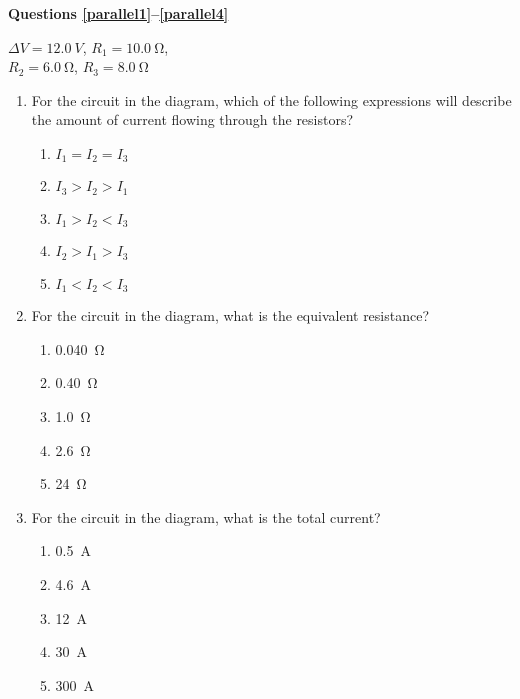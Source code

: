 \documentclass{../../../oss-apphys}
\begin{document}
\begin{multicols*}{2}
  \textbf{Questions \ref{parallel1}--\ref{parallel4}}
  \begin{center}
    
    \vspace{.1in}$\Delta V=\SI{12.0}{V}$, $R_1=\SI{10.0}{\ohm}$,\\
    $R_2=\SI{6.0}{\ohm}$, $R_3=\SI{8.0}{\ohm}$
  \end{center}

  \begin{enumerate}[leftmargin=18pt,resume]
  \item For the circuit in the diagram, which of the following expressions will
    describe the amount of current flowing through the resistors?
    \begin{enumerate}[noitemsep,topsep=0pt,leftmargin=18pt,label=(\Alph*)]
    \item $I_1=I_2=I_3$
    \item $I_3>I_2>I_1$
    \item $I_1>I_2<I_3$
    \item $I_2>I_1>I_3$
    \item $I_1<I_2<I_3$
    \end{enumerate}
    \label{parallel1}
    
  \item For the circuit in the diagram, what is the equivalent resistance?
    \begin{enumerate}[noitemsep,topsep=0pt,leftmargin=18pt,label=(\Alph*)]
      \item\SI{0.040}{\ohm}
      \item\SI{0.40}{\ohm}
      \item\SI{1.0}{\ohm}
      \item\SI{2.6}{\ohm}
      \item\SI{24}{\ohm}
    \end{enumerate}
    
  \item For the circuit in the diagram, what is the total current?
    \begin{enumerate}[noitemsep,topsep=0pt,leftmargin=18pt,label=(\Alph*)]
    \item\SI{0.5}{\ampere}
    \item\SI{4.6}{\ampere}
    \item\SI{12}{\ampere}
    \item\SI{30}{\ampere}
    \item\SI{300}{\ampere}
    \end{enumerate}
    

\end{enumerate}
\end{multicols*}
\end{document}
